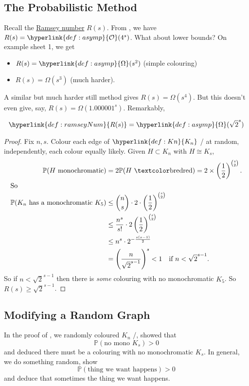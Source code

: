 \documentclass{article}
\begin{document}
\subsection{The Probabilistic Method}
Recall the \hyperlink{def:ramseyNum}{Ramsey number} $R(s)$.
From , we have $R(s) = \hyperlink{def:asymp}{\mathcal{O}}(4^s)$.
What about lower bounds?
On example sheet 1, we get
\begin{itemize}
    \item $R(s) = \hyperlink{def:asymp}{\Omega}(s^2)$ (simple colouring)
    \item $R(s) = \Omega(s^3)$ (much harder).
\end{itemize}
A similar but much harder still method gives $R(s) = \Omega(s^4)$.
But this doesn't even give, say, $R(s) = \Omega(1.000001^s)$.
Remarkably,
\begin{nthm}[Erd\H{o}s]\label{thm:37}
    \begin{equation*}
        \hyperlink{def:ramseyNum}{R(s)} = \hyperlink{def:asymp}{\Omega}(\sqrt{2}^s)
    \end{equation*}
\end{nthm}
\begin{proof}
    Fix $n,s$. Colour each edge of $\hyperlink{def:Kn}{K_n}$ / at random, independently, each colour equally likely.
    Given $H \subset K_n$ with $H \cong K_s$,
    \begin{align*}
        \mathbb{P}(H\text{ monochromatic}) &= 2 \mathbb{P}(H\text{ \red{red}}) = 2 \times \left(\frac{1}{2}\right)^{\binom{s}{2}}. \\
        \shortintertext{So}
        \mathbb{P}(K_n \text{ has a monochromatic } K_5) &\leq \binom{n}{s} \cdot 2 \cdot \left(\frac{1}{2}\right)^{\binom{s}{2}}  \\
                                        &\leq \frac{n^s}{s!} \cdot 2 \left(\frac{1}{2}\right)^{\binom{s}{2}} \\
                                        &\leq n^s \cdot 2^{-\frac{s(s-1)}{2}} \\
                                        &= \left(\frac{n}{\sqrt{2}^{s-1}}\right)^s < 1 \quad \text{if $n < \sqrt{2}^{s-1}$.}
    \end{align*}
    So if $n < \sqrt{2}^{s-1}$ then there is \emph{some} colouring with no monochromatic $K_5$.
    So $R(s) \geq \sqrt{2}^{s-1}$.
\end{proof}

\subsection{Modifying a Random Graph}
In the proof of , we randomly coloured \hyperlink{def:Kn}{$K_n$} /, showed that
\begin{equation*}
    \mathbb{P}(\text{no mono }K_s) > 0
\end{equation*}
and deduced there must be a colouring with no monochromatic $K_s$.
In general, we do something random, show
\begin{equation*}
    \mathbb{P}(\text{thing we want happens}) > 0 \tag{$*$} \label{eq:5.2star}
\end{equation*}
and deduce that sometimes the thing we want happens.
\end{document}
